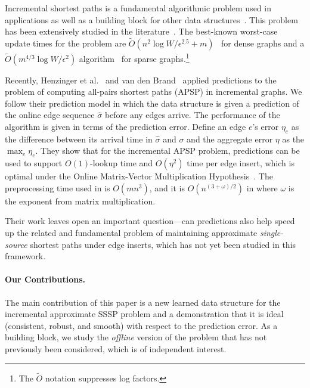 \documentclass[11pt]{article}
\begin{document}
Incremental shortest paths is a fundamental algorithmic problem used in applications as well as a building block for other data structures~\cite{RodittyZ11,HenzingerKN16}. 
This problem has been extensively studied in the literature~\cite{GutenbergW20,BernsteinGS21,BernsteinGW20,KyngMeGu22,chechik2021incremental,henzinger2014sublinear, henzinger2015improved}. 
The best-known worst-case update times for the problem are $\tilde{O}(n
^2 \log W/\epsilon^{2.5} + m)$~\cite{probst2020new} for dense graphs and a $\tilde{O}(m^{4/3}\log W/\epsilon^2)$ algorithm~\cite{KyngMeGu22} for sparse graphs.\footnote{The $\tilde{O}$ notation suppresses log factors.}  

Recently, Henzinger et al.~\cite{HenzingerSSY24} and van den Brand~\cite{BrandFNP24} applied predictions to the problem of computing all-pairs shortest paths (APSP) in incremental graphs.  
We follow their prediction model in which the data structure is given a prediction of the online edge sequence $\hat{\sigma}$ before any edges arrive.  The performance of the algorithm is given in terms of the prediction error.  Define an edge $e$'s error $\eta_e$ as the difference between its arrival time in $\hat{\sigma}$ and $\sigma$ and the aggregate error $\eta$ as the $\max_{e} \eta_e$.  They show that for the incremental APSP problem, predictions can be used to support $O(1)$-lookup time and $O(\eta^2)$ time per edge insert, which is optimal under the Online Matrix-Vector Multiplication Hypothesis~\cite{BrandFNP24}.  The preprocessing time used in \cite{HenzingerSSY24} is $O(mn^3)$, and it is $O(n^{(3 + \omega)/2})$ in \cite{BrandFNP24} where $\omega$ is the exponent from matrix multiplication. 

Their work leaves open an important question---can predictions also help speed up the related and fundamental problem of maintaining approximate \emph{single-source} shortest paths under edge inserts, which has not yet been studied in this framework.
 
\paragraph{Our Contributions.}   The main contribution of this paper is a new learned data structure for the incremental approximate SSSP problem and a demonstration that it is ideal (consistent, robust, and smooth) with respect to the prediction error.
As a building block, we study the \emph{offline} version of the problem that has not previously been considered, which is of independent interest. 
\end{document}
